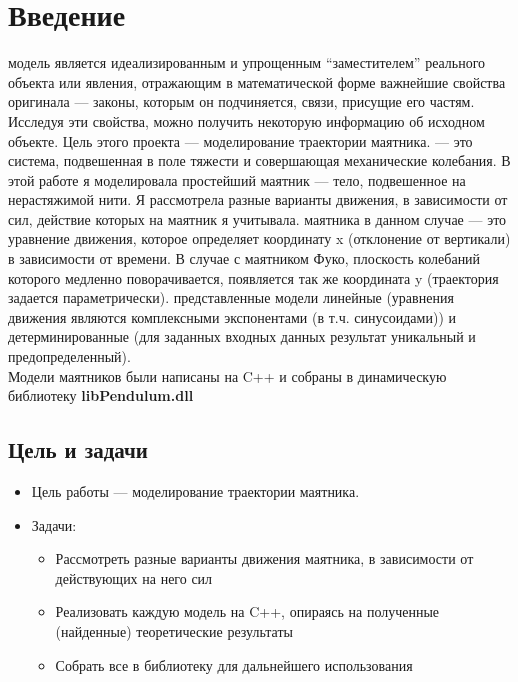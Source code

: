 \section*{Введение}
 модель является идеализированным и упрощенным ``заместителем'' реального объекта или явления, отражающим в математической форме важнейшие свойства оригинала --- законы, которым он подчиняется, связи, присущие его частям. Исследуя эти свойства, можно получить некоторую информацию об исходном объекте. Цель этого проекта --- моделирование траектории маятника. 
 --- это система, подвешенная в поле тяжести и совершающая механические колебания. В этой работе я моделировала простейший маятник --- тело, подвешенное на нерастяжимой нити. Я рассмотрела разные варианты движения, в зависимости от сил, действие которых на маятник я учитывала.
 маятника в данном случае --- это уравнение движения, которое определяет координату x (отклонение от вертикали) в зависимости от времени. В случае с маятником Фуко, плоскость колебаний которого медленно поворачивается, появляется так же координата y (траектория задается параметрически).
 представленные модели линейные (уравнения движения являются комплексными экспонентами (в т.ч. синусоидами)) и детерминированные (для заданных входных данных результат уникальный и предопределенный). \\
Модели маятников были написаны на C++ и собраны в динамическую библиотеку \textbf{libPendulum.dll}
\subsection*{Цель и задачи}
\begin{itemize}
		\item Цель работы --- моделирование траектории маятника.
		\item Задачи:
			\begin{itemize}
					\item Рассмотреть разные варианты движения маятника, в зависимости от действующих на него сил
					\item Реализовать каждую модель на C++, опираясь на полученные (найденные) теоретические результаты
					\item Собрать все в библиотеку для дальнейшего использования
			\end{itemize}
\end{itemize}

